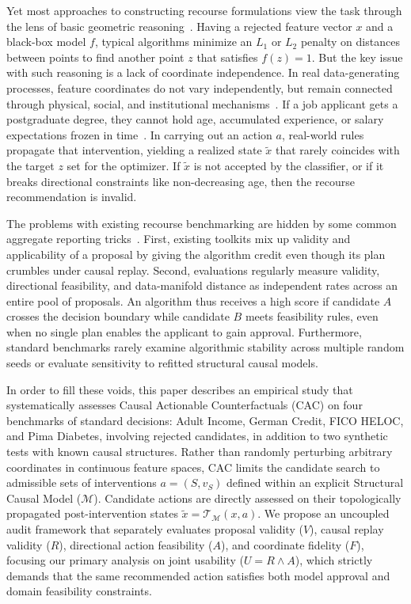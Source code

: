 \documentclass[nolineno]{paper/ieee-access/ieeeaccess}%
\newcommand{\CAC}{CAC}
\newcommand{\SCM}{\ensuremath{\mathcal{M}}}
\newcommand{\Replay}{\ensuremath{\mathcal{T}_{\SCM}}}
\begin{document}
Yet most approaches to constructing recourse formulations view the task through the lens of basic geometric reasoning~\cite{mothilal2020dice, wachter2017counterfactual}. Having a rejected feature vector $x$ and a black-box model $f$, typical algorithms minimize an $L_1$ or $L_2$ penalty on distances between points to find another point $z$ that satisfies $f(z)=1$. But the key issue with such reasoning is a lack of coordinate independence. In real data-generating processes, feature coordinates do not vary independently, but remain connected through physical, social, and institutional mechanisms~\cite{karimi2021recourse, karimi2020imperfect}. If a job applicant gets a postgraduate degree, they cannot hold age, accumulated experience, or salary expectations frozen in time~\cite{pearl2009causality}. In carrying out an action $a$, real-world rules propagate that intervention, yielding a realized state $\widetilde{x}$ that rarely coincides with the target $z$ set for the optimizer. If $\widetilde{x}$ is not accepted by the classifier, or if it breaks directional constraints like non-decreasing age, then the recourse recommendation is invalid.

The problems with existing recourse benchmarking are hidden by some common aggregate reporting tricks~\cite{pawelczyk2021carla, upadhyay2021robust}. First, existing toolkits mix up validity and applicability of a proposal by giving the algorithm credit even though its plan crumbles under causal replay. Second, evaluations regularly measure validity, directional feasibility, and data-manifold distance as independent rates across an entire pool of proposals. An algorithm thus receives a high score if candidate $A$ crosses the decision boundary while candidate $B$ meets feasibility rules, even when no single plan enables the applicant to gain approval. Furthermore, standard benchmarks rarely examine algorithmic stability across multiple random seeds or evaluate sensitivity to refitted structural causal models.

In order to fill these voids, this paper describes an empirical study that systematically assesses Causal Actionable Counterfactuals (\CAC{}) on four benchmarks of standard decisions: Adult Income, German Credit, FICO HELOC, and Pima Diabetes, involving \TotalApplicants{} rejected candidates, in addition to two synthetic tests with known causal structures. Rather than randomly perturbing arbitrary coordinates in continuous feature spaces, \CAC{} limits the candidate search to admissible sets of interventions $a=(S, v_S)$ defined within an explicit Structural Causal Model (\SCM{}). Candidate actions are directly assessed on their topologically propagated post-intervention states $\widetilde{x}=\Replay(x, a)$. We propose an uncoupled audit framework that separately evaluates proposal validity ($V$), causal replay validity ($R$), directional action feasibility ($A$), and coordinate fidelity ($F$), focusing our primary analysis on joint usability ($U = R \land A$), which strictly demands that the same recommended action satisfies both model approval and domain feasibility constraints.
\end{document}
